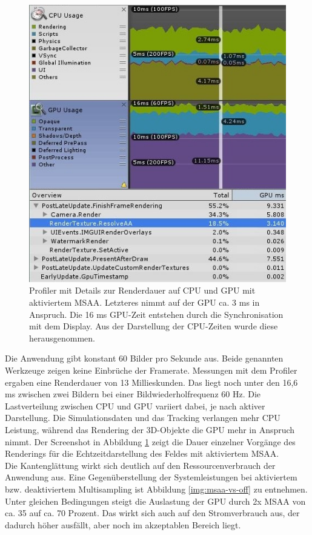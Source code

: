 \begin{figure}[h!]
	\centering
	\includegraphics[width=\textwidth]{images/performance/profile_MSAA_on_cut.jpg}
	\caption{Profiler mit Details zur Renderdauer auf CPU und GPU mit aktiviertem MSAA. Letzteres nimmt auf der GPU ca. 3 ms in Anspruch. Die 16 ms GPU-Zeit entstehen durch die Synchronisation mit dem Display. Aus der Darstellung der CPU-Zeiten wurde diese herausgenommen.}
	\label{img:profiler}
\end{figure}

Die Anwendung gibt konstant 60 Bilder pro Sekunde aus. Beide genannten Werkzeuge zeigen keine Einbrüche der Framerate. Messungen mit dem Profiler ergaben eine Renderdauer von 13 Millieskunden. Das liegt noch unter den 16,6 ms zwischen zwei Bildern bei einer Bildwiederholfrequenz 60 Hz. Die Lastverteilung zwischen CPU und GPU variiert dabei, je nach aktiver Darstellung. Die Simulationsdaten und das Tracking verlangen mehr CPU Leistung, während das Rendering der 3D-Objekte die GPU mehr in Anspruch nimmt. Der Screenshot in Abbildung \ref{img:profiler} zeigt die Dauer einzelner Vorgänge des Renderings für die Echtzeitdarstellung des Feldes mit aktiviertem MSAA.\\

Die Kantenglättung wirkt sich deutlich auf den Ressourcenverbrauch der Anwendung aus. Eine Gegenüberstellung der Systemleistungen bei aktiviertem bzw. deaktiviertem Multisampling ist Abbildung \ref{img:msaa-vs-off} zu entnehmen. Unter gleichen Bedingungen steigt die Auslastung der GPU durch 2x MSAA von ca. 35 auf ca. 70 Prozent. Das wirkt sich auch auf den Stromverbrauch aus, der dadurch höher ausfällt, aber noch im akzeptablen Bereich liegt.\\

